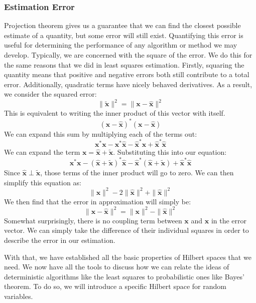 \subsubsection{Estimation Error}
Projection theorem gives us a guarantee that we can find the closest possible estimate of a quantity, but some error will still exist. Quantifying this error is useful for determining the performance of any algorithm or method we may develop. Typically, we are concerned with the square of the error. We do this for the same reasons that we did in least squares estimation. Firstly, squaring the quantity means that positive and negative errors both still contribute to a total error. Additionally, quadratic terms have nicely behaved derivatives. As a result, we consider the squared error:
$$\|\bm{\tilde{x}}\|^2=\|\bm{x}-\bm{\hat{x}}\|^2$$
This is equivalent to writing the inner product of this vector with itself.
$$(\bm{x}-\bm{\hat{x}})^*(\bm{x}-\bm{\hat{x}})$$
We can expand this sum by multiplying each of the terms out:
$$\bm{x}^*\bm{x}-\bm{x}^*\bm{\hat{x}}-\bm{\hat{x}}^*\bm{x}+\bm{\hat{x}}^*\bm{\hat{x}}$$
We can expand the term $\bm{x}=\bm{\hat{x}}+\bm{\tilde{x}}$. Substituting this into our equation:
$$\bm{x}^*\bm{x}-(\bm{\hat{x}}+\bm{\tilde{x}})^*\bm{\hat{x}}-\bm{\hat{x}}^*(\bm{\hat{x}}+\bm{\tilde{x}})+\bm{\hat{x}}^*\bm{\hat{x}}$$
Since $\bm{\hat{x}}\perp\bm{\tilde{x}}$, those terms of the inner product will go to zero. We can then simplify this equation as:
$$\|\bm{x}\|^2-2\|\bm{\hat{x}}\|^2+\|\bm{\hat{x}}\|^2$$
We then find that the error in approximation will simply be:
$$\|\bm{x}-\bm{\hat{x}}\|^2=\|\bm{x}\|^2-\|\bm{\hat{x}}\|^2$$
Somewhat surprisingly, there is no coupling term between $\bm{x}$ and $\bm{\hat{x}}$ in the error vector. We can simply take the difference of their individual squares in order to describe the error in our estimation.

With that, we have established all the basic properties of Hilbert spaces that we need. We now have all the tools to discuss how we can relate the ideas of deterministic algorithms like the least squares to probabilistic ones like Bayes' theorem. To do so, we will introduce a specific Hilbert space for random variables.

